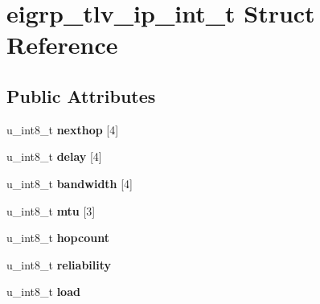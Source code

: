 \hypertarget{structeigrp__tlv__ip__int__t}{
\section{eigrp\_\-tlv\_\-ip\_\-int\_\-t Struct Reference}
\label{structeigrp__tlv__ip__int__t}
}
\subsection*{Public Attributes}
\begin{DoxyCompactItemize}
\item 
\hypertarget{structeigrp__tlv__ip__int__t_a9d4fa3a0c4710bd14d19c5945e966f0b}{
u\_\-int8\_\-t {\bfseries nexthop} \mbox{[}4\mbox{]}}
\label{structeigrp__tlv__ip__int__t_a9d4fa3a0c4710bd14d19c5945e966f0b}

\item 
\hypertarget{structeigrp__tlv__ip__int__t_a8fc928431c95bac2466905afb83b935e}{
u\_\-int8\_\-t {\bfseries delay} \mbox{[}4\mbox{]}}
\label{structeigrp__tlv__ip__int__t_a8fc928431c95bac2466905afb83b935e}

\item 
\hypertarget{structeigrp__tlv__ip__int__t_a901bf4e42922d7b17f185b092f7602c0}{
u\_\-int8\_\-t {\bfseries bandwidth} \mbox{[}4\mbox{]}}
\label{structeigrp__tlv__ip__int__t_a901bf4e42922d7b17f185b092f7602c0}

\item 
\hypertarget{structeigrp__tlv__ip__int__t_afd3884636b34be5ea153e1c48f4857ac}{
u\_\-int8\_\-t {\bfseries mtu} \mbox{[}3\mbox{]}}
\label{structeigrp__tlv__ip__int__t_afd3884636b34be5ea153e1c48f4857ac}

\item 
\hypertarget{structeigrp__tlv__ip__int__t_af8a54fb2e3213e8de1cd1913225486ec}{
u\_\-int8\_\-t {\bfseries hopcount}}
\label{structeigrp__tlv__ip__int__t_af8a54fb2e3213e8de1cd1913225486ec}

\item 
\hypertarget{structeigrp__tlv__ip__int__t_ad409508afd14d5418595668b1599dad9}{
u\_\-int8\_\-t {\bfseries reliability}}
\label{structeigrp__tlv__ip__int__t_ad409508afd14d5418595668b1599dad9}

\item 
\hypertarget{structeigrp__tlv__ip__int__t_a6bcea03a3c71699c60d92b95079a6892}{
u\_\-int8\_\-t {\bfseries load}}
\label{structeigrp__tlv__ip__int__t_a6bcea03a3c71699c60d92b95079a6892}


\end{DoxyCompactItemize}
